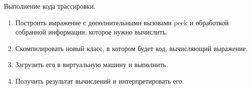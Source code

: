 \begin{frame}
\frametitle{\insertsection} 
\framesubtitle{\insertsubsection}
Выполнение кода трассировки.
\begin{enumerate}
	\item Построить выражение с дополнительными вызовами peek и обработкой собранной информации, которое нужно вычислить.
	\item Скомпилировать новый класс, в котором будет код, вычисляющий выражение.
	\item Загрузить его в виртуальную машину и выполнить.
	\item Получить результат вычислений и интерпретировать его.
\end{enumerate}
\end{frame}
